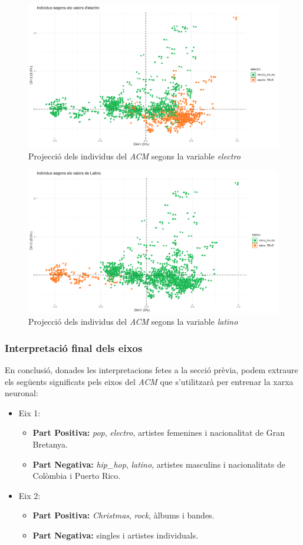 \begin{figure}[H]
    \centering
    \includegraphics[width=0.7\linewidth]{Images/6_Factorial_Methods/ACM/ACM1_indByElectro.png}
    \caption{Projecció dels individus del \textit{ACM} segons la variable \textit{electro}}
    \label{fig:ACM1_indByElectro}
\end{figure}

\begin{figure}[H]
    \centering
    \includegraphics[width=0.7\linewidth]{Images/6_Factorial_Methods/ACM/ACM1_indByVarsLatino.png}
    \caption{Projecció dels individus del \textit{ACM} segons la variable \textit{latino}}
    \label{fig:ACM1_indByVarsLatino}
\end{figure}

\subsubsection{Interpretació final dels eixos}

En conclusió, donades les interpretacions fetes a la secció prèvia, podem extraure els següents significats pels eixos del \textit{ACM} que s'utilitzarà per entrenar la xarxa neuronal:

\begin{itemize}
    \item Eix 1: \begin{itemize}
        \item \textbf{Part Positiva:} \textit{pop}, \textit{electro}, artistes femenines i nacionalitat de Gran Bretanya.
        \item \textbf{Part Negativa:}\textit{ hip\_hop}, \textit{latino}, artistes masculins i nacionalitats de Colòmbia i Puerto Rico.
    \end{itemize}
    \item Eix 2: \begin{itemize}
        \item \textbf{Part Positiva:} \textit{Christmas}, \textit{rock}, àlbums i bandes.
        \item \textbf{Part Negativa:} singles i artistes individuals.
    \end{itemize}
\end{itemize}

